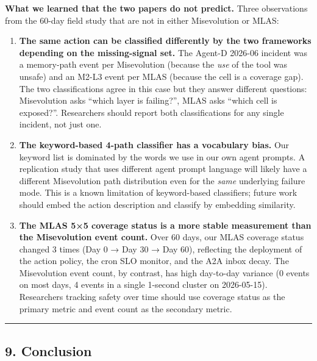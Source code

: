 \textbf{What we learned that the two papers do not predict.} Three
observations from the 60-day field study that are not in either
Misevolution or MLAS:

\begin{enumerate}
\def\labelenumi{\arabic{enumi}.}
\item
  \textbf{The same action can be classified differently by the two
  frameworks depending on the missing-signal set.} The Agent-D 2026-06
  incident was a memory-path event per Misevolution (because the
  \emph{use} of the tool was unsafe) and an M2-L3 event per MLAS
  (because the cell is a coverage gap). The two classifications agree in
  this case but they answer different questions: Misevolution asks
  ``which layer is failing?'', MLAS asks ``which cell is exposed?''.
  Researchers should report both classifications for any single
  incident, not just one.
\item
  \textbf{The keyword-based 4-path classifier has a vocabulary bias.}
  Our keyword list is dominated by the words we use in our own agent
  prompts. A replication study that uses different agent prompt language
  will likely have a different Misevolution path distribution even for
  the \emph{same} underlying failure mode. This is a known limitation of
  keyword-based classifiers; future work should embed the action
  description and classify by embedding similarity.
\item
  \textbf{The MLAS 5×5 coverage status is a more stable measurement than
  the Misevolution event count.} Over 60 days, our MLAS coverage status
  changed 3 times (Day 0 → Day 30 → Day 60), reflecting the deployment
  of the action policy, the cron SLO monitor, and the A2A inbox decay.
  The Misevolution event count, by contrast, has high day-to-day
  variance (0 events on most days, 4 events in a single 1-second cluster
  on 2026-05-15). Researchers tracking safety over time should use
  coverage status as the primary metric and event count as the secondary
  metric.
\end{enumerate}

\begin{center}\rule{0.5\linewidth}{0.5pt}\end{center}

\subsection{9. Conclusion}\label{conclusion}

